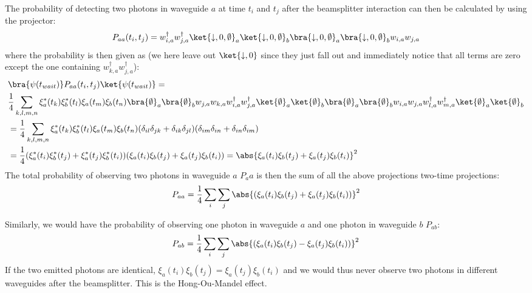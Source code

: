 The probability of detecting two photons in waveguide $a$ at time $t_i$ and $t_j$ after the beamsplitter interaction can then be calculated by using the projector:
\begin{equation}
P_{aa}(t_i,t_j) = w_{i,a}^\dagger w_{j,a}^\dagger \ket{\downarrow,0,\emptyset}_a \ket{\downarrow,0,\emptyset}_b \bra{\downarrow,0,\emptyset}_a \bra{\downarrow,0,\emptyset}_b w_{i,a} w_{j,a}    
\end{equation}
where the probability is then given as (we here leave out $\ket{\downarrow,0}$ since they just fall out and immediately notice that all terms are zero except the one containing $w_{k,a}^\dagger w_{j,a}^\dagger$):
\begin{align}
    &\bra{\psi(t_{wait})} P_{aa}(t_i,t_j) \ket{\psi(t_{wait})} = \\
    &\frac{1}{4} \sum_{k,l,m,n} \xi_a^*(t_k)\xi_b^*(t_l) \xi_a(t_m)\xi_b(t_n) \bra{\emptyset}_a \bra{\emptyset}_b w_{j,a} w_{k,a} w_{i,a}^\dagger w_{j,a}^\dagger  \ket{\emptyset}_a \ket{\emptyset}_b \bra{\emptyset}_a \bra{\emptyset}_b w_{i,a} w_{j,a} w_{l,a}^\dagger w_{m,a}^\dagger  \ket{\emptyset}_a \ket{\emptyset}_b \\
    & = \frac{1}{4} \sum_{k,l,m,n}  \xi_a^*(t_k)\xi_b^*(t_l) \xi_a(t_m)\xi_b(t_n) (\delta_{il}\delta_{jk}+\delta_{ik}\delta_{jl})(\delta_{im}\delta_{in}+\delta_{in}\delta_{im}) \\
    &= \frac{1}{4} (\xi_a^*(t_i)\xi_b^*(t_j) + \xi_a^*(t_j)\xi_b^*(t_i))(\xi_a(t_i)\xi_b(t_j) +\xi_a(t_j)\xi_b(t_i)) = \abs{\xi_a(t_i)\xi_b(t_j) +\xi_a(t_j)\xi_b(t_i)}^2
\end{align}
The total probability of observing two photons in waveguide $a$ $P_aa$ is then the sum of all the above projections two-time projections:
\begin{equation}
   P_{aa} = \frac{1}{4} \sum_i \sum_j \abs{( \xi_a(t_i)\xi_b(t_j) + \xi_a(t_j)\xi_b(t_i))}^2
\end{equation}

Similarly, we would have the probability of observing one photon in waveguide $a$ and one photon in waveguide $b$ $P_{ab}$:
\begin{equation}
   P_{ab} = \frac{1}{4} \sum_i \sum_j \abs{( \xi_a(t_i)\xi_b(t_j) - \xi_a(t_j)\xi_b(t_i))}^2
\end{equation}
If the two emitted photons are identical, $\xi_a(t_i)\xi_b(t_j) =  \xi_a(t_j)\xi_b(t_i)$ and we would thus never observe two photons in different waveguides after the beamsplitter. This is the Hong-Ou-Mandel effect. 

